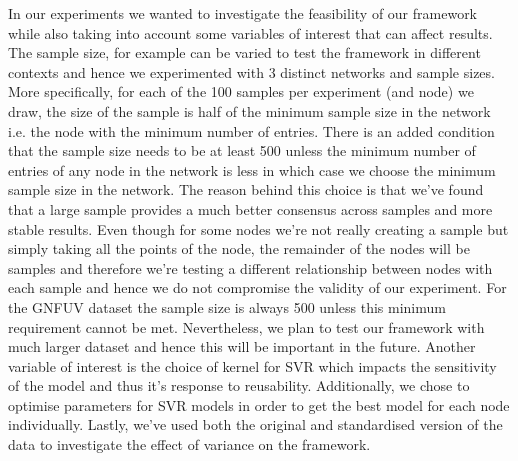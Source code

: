 \documentclass{mprop}
\begin{document}
In our experiments we wanted to investigate the feasibility of our framework while also taking into account some variables of interest that can affect results. The sample size, for example can be varied to test the framework in different contexts and hence we experimented with 3 distinct networks and sample sizes. More specifically, for each of the 100 samples per experiment (and node) we draw, the size of the sample is half of the minimum sample size in the network i.e. the node with the minimum number of entries. There is an added condition that the sample size needs to be at least 500 unless the minimum number of entries of any node in the network is less in which case we choose the minimum sample size in the network. The reason behind this choice is that we've found that a large sample provides a much better consensus across samples and more stable results. Even though for some nodes we're not really creating a sample but simply taking all the points of the node, the remainder of the nodes will be samples and therefore we're testing a different relationship between nodes with each sample and hence we do not compromise the validity of our experiment. For the GNFUV dataset the sample size is always 500 unless this minimum requirement cannot be met. Nevertheless, we plan to test our framework with much larger dataset and hence this will be important in the future. Another variable of interest is the choice of kernel for SVR which impacts the sensitivity of the model and thus it's response to reusability. Additionally, we chose to optimise parameters for SVR models in order to get the best model for each node individually. Lastly, we've used both the original and standardised version of the data to investigate the effect of variance on the framework.
\end{document}
